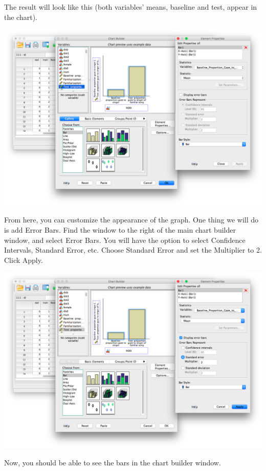 \documentclass[
]{book}
\begin{document}
The result will look like this (both variables' means, baseline and test, appear in the chart).

\includegraphics{img/6.4.27.png}

From here, you can customize the appearance of the graph. One thing we will do is add Error Bars. Find the window to the right of the main chart builder window, and select {Error Bars}. You will have the option to select Confidence Intervals, Standard Error, etc. Choose {Standard Error} and set the {Multiplier to 2}. Click {Apply}.

\includegraphics{img/6.4.28.png}

Now, you should be able to see the bars in the chart builder window.
\end{document}
